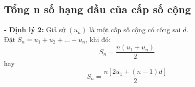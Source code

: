 \subsection{Tổng n số hạng đầu của cấp số cộng}
\noindent\hspace*{1cm}\textbf{- Định lý 2:} Giả sử $(u_n)$ là một cấp số cộng có công sai $d$.\\[6pt]
\noindent\hspace*{1cm} Đặt \mbox{$S_n = u_1 + u_2 + ... + u_n$}, khi đó:
\noindent\hspace*{1cm}
\[
	\boxed{S_n = \dfrac{n(u_1 + u_n)}{2}}
\]
\noindent\hspace*{1.5cm} hay
\[
	\boxed{S_n = \dfrac{n[2u_1 + (n-1)d]}{2}}
\]

